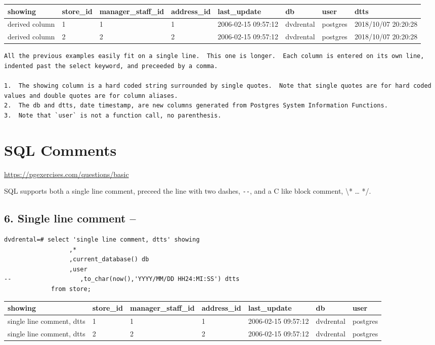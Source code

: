 \documentclass[]{book}
\theoremstyle{definition}
\theoremstyle{definition}
\theoremstyle{definition}
\theoremstyle{remark}
\begin{document}
\begin{longtable}[]{@{}llllllll@{}}
\toprule
showing & store\_id & manager\_staff\_id & address\_id & last\_update &
db & user & dtts\tabularnewline
\midrule
\endhead
derived column & 1 & 1 & 1 & 2006-02-15 09:57:12 & dvdrental & postgres
& 2018/10/07 20:20:28\tabularnewline
derived column & 2 & 2 & 2 & 2006-02-15 09:57:12 & dvdrental & postgres
& 2018/10/07 20:20:28\tabularnewline
\bottomrule
\end{longtable}

\begin{verbatim}
All the previous examples easily fit on a single line.  This one is longer.  Each column is entered on its own line, indented past the select keyword, and preceeded by a comma.  

1.  The showing column is a hard coded string surrounded by single quotes.  Note that single quotes are for hard coded values and double quotes are for column aliases.  
2.  The db and dtts, date timestamp, are new columns generated from Postgres System Information Functions.
3.  Note that `user` is not a function call, no parenthesis.  
\end{verbatim}

\hypertarget{sql-comments}{%
\section{SQL Comments}\label{sql-comments}}

\url{https://pgexercises.com/questions/basic}

SQL supports both a single line comment, preceed the line with two
dashes, \texttt{-\/-}, and a C like block comment, \textbackslash{}*
\ldots{} */.

\hypertarget{single-line-comment}{%
\subsection{6. Single line comment --}\label{single-line-comment}}

\begin{verbatim}
dvdrental=# select 'single line comment, dtts' showing       
                  ,*
                  ,current_database() db
                  ,user
--                   ,to_char(now(),'YYYY/MM/DD HH24:MI:SS') dtts
             from store;
\end{verbatim}

\begin{longtable}[]{@{}lllllll@{}}
\toprule
showing & store\_id & manager\_staff\_id & address\_id & last\_update &
db & user\tabularnewline
\midrule
\endhead
single line comment, dtts & 1 & 1 & 1 & 2006-02-15 09:57:12 & dvdrental
& postgres\tabularnewline
single line comment, dtts & 2 & 2 & 2 & 2006-02-15 09:57:12 & dvdrental
& postgres\tabularnewline
\bottomrule
\end{longtable}
\end{document}
